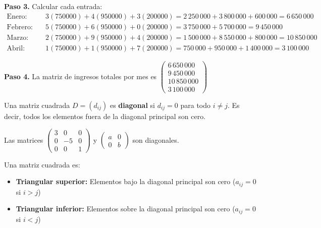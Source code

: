 \begin{example}
\begin{myproof}
\textbf{Paso 3.} Calcular cada entrada:
\begin{align*}
\text{Enero:}  & \quad 3(750000) + 4(950000) + 3(200000) = 2\,250\,000 + 3\,800\,000 + 600\,000 = 6\,650\,000 \\
\text{Febrero:} & \quad 5(750000) + 6(950000) + 0(200000) = 3\,750\,000 + 5\,700\,000 = 9\,450\,000 \\
\text{Marzo:}  & \quad 2(750000) + 9(950000) + 4(200000) = 1\,500\,000 + 8\,550\,000 + 800\,000 = 10\,850\,000 \\
\text{Abril:}  & \quad 1(750000) + 1(950000) + 7(200000) = 750\,000 + 950\,000 + 1\,400\,000 = 3\,100\,000
\end{align*}

\textbf{Paso 4.} La matriz de ingresos totales por mes es \(
\boxed{\begin{pmatrix}
6\,650\,000 \\
9\,450\,000 \\
10\,850\,000 \\
3\,100\,000
\end{pmatrix}}
\)
\end{myproof}
\end{example}

\begin{definition}
Una matriz cuadrada $D = (d_{ij})$ es \textbf{diagonal} si $d_{ij} = 0$ para todo $i \neq j$. Es decir, todos los elementos fuera de la diagonal principal son cero.
\end{definition}

\begin{example} Las matrices
$\begin{pmatrix}
3 & 0 & 0 \\
0 & -5 & 0 \\
0 & 0 & 1
\end{pmatrix}$ y $\begin{pmatrix}
a & 0 \\
0 & b
\end{pmatrix}$ son diagonales.
\end{example}

\begin{definition}
Una matriz cuadrada es:
\begin{itemize}
\item \textbf{Triangular superior:} Elementos bajo la diagonal principal son cero ($a_{ij}=0$ si $i>j$)
\item \textbf{Triangular inferior:} Elementos sobre la diagonal principal son cero ($a_{ij}=0$ si $i<j$)
\end{itemize}
\end{definition}

